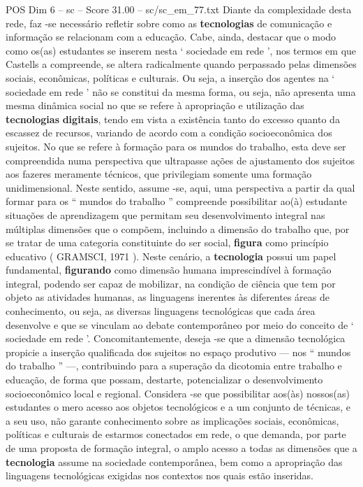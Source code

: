 \begin{textsample}{POS Dim 6 – sc – Score 31.00 – sc/sc\_em\_77.txt}
Diante da complexidade desta rede, faz -se necessário refletir sobre como as \textbf{tecnologias} de comunicação e informação se relacionam com a educação.
Cabe, ainda, destacar que o modo como os(as) estudantes se inserem nesta ‘ sociedade em rede ’, nos termos em que Castells a compreende, se altera radicalmente quando perpassado pelas dimensões sociais, econômicas, políticas e culturais.
Ou seja, a inserção dos agentes na ‘ sociedade em rede ’ não se constitui da mesma forma, ou seja, não apresenta uma mesma dinâmica social no que se refere à apropriação e utilização das \textbf{tecnologias} \textbf{digitais}, tendo em vista a existência tanto do excesso quanto da escassez de recursos, variando de acordo com a condição socioeconômica dos sujeitos.
No que se refere à formação para os mundos do trabalho, esta deve ser compreendida numa perspectiva que ultrapasse ações de ajustamento dos sujeitos aos fazeres meramente técnicos, que privilegiam somente uma formação unidimensional.
Neste sentido, assume -se, aqui, uma perspectiva a partir da qual formar para os “ mundos do trabalho ” compreende possibilitar ao(à) estudante situações de aprendizagem que permitam seu desenvolvimento integral nas múltiplas dimensões que o compõem, incluindo a dimensão do trabalho que, por se tratar de uma categoria constituinte do ser social, \textbf{figura} como princípio educativo ( GRAMSCI, 1971 ).
Neste cenário, a \textbf{tecnologia} possui um papel fundamental, \textbf{figurando} como dimensão humana imprescindível à formação integral, podendo ser capaz de mobilizar, na condição de ciência que tem por objeto as atividades humanas, as linguagens inerentes às diferentes áreas de conhecimento, ou seja, as diversas linguagens tecnológicas que cada área desenvolve e que se vinculam ao debate contemporâneo por meio do conceito de ‘ sociedade em rede ’.
Concomitantemente, deseja -se que a dimensão tecnológica propicie a inserção qualificada dos sujeitos no espaço produtivo — nos “ mundos do trabalho ” —, contribuindo para a superação da dicotomia entre trabalho e educação, de forma que possam, destarte, potencializar o desenvolvimento socioeconômico local e regional.
Considera -se que possibilitar aos(às) nossos(as) estudantes o mero acesso aos objetos tecnológicos e a um conjunto de técnicas, e a seu uso, não garante conhecimento sobre as implicações sociais, econômicas, políticas e culturais de estarmos conectados em rede, o que demanda, por parte de uma proposta de formação integral, o amplo acesso a todas as dimensões que a \textbf{tecnologia} assume na sociedade contemporânea, bem como a apropriação das linguagens tecnológicas exigidas nos contextos nos quais estão inseridas.

\end{textsample}
